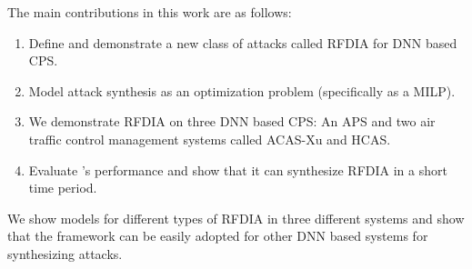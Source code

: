 The main contributions in this work are as follows:

\begin{enumerate}
	\item Define and demonstrate a new class of attacks called \ac{RFDIA} for \ac{DNN} based \ac{CPS}. 
	\item Model attack synthesis as an optimization problem (specifically as a \ac{MILP}). 
	\item We demonstrate \ac{RFDIA} on three \ac{DNN} based \ac{CPS}:  An \ac{APS} and two air traffic control management systems called \ac{ACAS-Xu} and \ac{HCAS}.
	\item Evaluate \tool's performance and show that it can synthesize \ac{RFDIA} in a short time period.  
\end{enumerate}
 
We show models for different types of RFDIA in three different systems and show that the framework can be easily adopted for other \ac{DNN} based systems for synthesizing attacks. 







